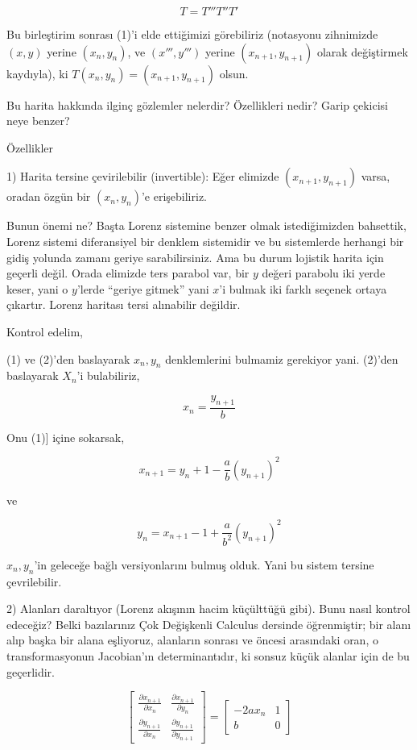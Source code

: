 \documentclass[12pt,fleqn]{article}\usepackage{../../common}
\begin{document}
$$ T = T''' T'' T'$$

Bu birleştirim sonrası (1)'i elde ettiğimizi görebiliriz (notasyonu
zihnimizde $(x,y)$ yerine $(x_n,y_n)$, ve $(x''',y''')$ yerine
$(x_{n+1},y_{n+1})$ olarak değiştirmek kaydıyla), ki
$T(x_n,y_n) = (x_{n+1},y_{n+1})$ olsun.

Bu harita hakkında ilginç gözlemler nelerdir? Özellikleri nedir? Garip
çekicisi neye benzer?

Özellikler

1) Harita tersine çevirilebilir (invertible): Eğer elimizde
$(x_{n+1},y_{n+1})$ varsa, oradan özgün bir $(x_n,y_n)$'e erişebiliriz.

Bunun önemi ne? Başta Lorenz sistemine benzer olmak istediğimizden
bahsettik, Lorenz sistemi diferansiyel bir denklem sistemidir ve bu
sistemlerde herhangi bir gidiş yolunda zamanı geriye sarabilirsiniz. Ama bu
durum lojistik harita için geçerli değil. Orada elimizde ters parabol var,
bir $y$ değeri parabolu iki yerde keser, yani o $y$'lerde ``geriye gitmek''
yani $x$'i bulmak iki farklı seçenek ortaya çıkartır. Lorenz haritası tersi
alınabilir değildir.

Kontrol edelim, 

(1) ve (2)'den baslayarak $x_n,y_n$ denklemlerini bulmamiz gerekiyor
yani. (2)'den baslayarak $X_n$'i bulabiliriz,

$$ x_n = \frac{y_{n+1}}{b}$$

Onu (1)] içine sokarsak,

$$ x_{n+1} = y_n + 1 - \frac{a}{b}(y_{n+1})^2  $$

ve

$$ y_n = x_{n+1} - 1 + \frac{a}{b^2}(y_{n+1})^2  $$

$x_n,y_n$'in geleceğe bağlı versiyonlarını bulmuş olduk. Yani bu sistem
tersine çevrilebilir. 

2) Alanları daraltıyor (Lorenz akışının hacim küçülttüğü gibi). Bunu nasıl
kontrol edeceğiz? Belki bazılarınız Çok Değişkenli Calculus dersinde
öğrenmiştir; bir alanı alıp başka bir alana eşliyoruz, alanların sonrası ve
öncesi arasındaki oran, o transformasyonun Jacobian'ın determinantıdır, ki
sonsuz küçük alanlar için de bu geçerlidir.

$$ 
\left[\begin{array}{rr}
\frac{\partial x_{n+1}}{\partial x_n} & \frac{\partial x_{n+1}}{\partial y_n} \\
\frac{\partial y_{n+1}}{\partial x_n} & \frac{\partial y_{n+1}}{\partial y_{n+1}} 
\end{array}\right] = 
\left[\begin{array}{rr}
-2ax_n & 1 \\
b & 0
\end{array}\right] 
$$
\end{document}

